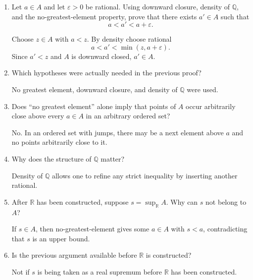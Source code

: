 \documentclass{self-check}
\begin{document}
\begin{enumerate}[label=\arabic*., itemsep=10pt]
\begin{answer}
Any $b\in B$ is an upper bound for every element of $A$.
\end{answer}

\item Let $a\in A$ and let $\varepsilon>0$ be rational.
Using downward closure, density of $\mathbb{Q}$, and the no-greatest-element property, prove that there exists $a'\in A$ such that
\[
a<a'<a+\varepsilon.
\]

\begin{answer}
Choose $z\in A$ with $a<z$. By density choose rational
\[
a<a'<\min(z,a+\varepsilon).
\]
Since $a'<z$ and $A$ is downward closed, $a'\in A$.
\end{answer}

\item Which hypotheses were actually needed in the previous proof?

\begin{answer}
No greatest element, downward closure, and density of $\mathbb{Q}$ were used.
\end{answer}

\item Does ``no greatest element'' alone imply that points of $A$ occur arbitrarily close above every $a\in A$ in an arbitrary ordered set?

\begin{answer}
No. In an ordered set with jumps, there may be a next element above $a$ and no points arbitrarily close to it.
\end{answer}

\item Why does the structure of $\mathbb{Q}$ matter?

\begin{answer}
Density of $\mathbb{Q}$ allows one to refine any strict inequality by inserting another rational.
\end{answer}

\item After $\mathbb{R}$ has been constructed, suppose $s=\sup_{\mathbb{R}}A$.
Why can $s$ not belong to $A$?

\begin{answer}
If $s\in A$, then no-greatest-element gives some $a\in A$ with $s<a$, contradicting that $s$ is an upper bound.
\end{answer}

\item Is the previous argument available before $\mathbb{R}$ is constructed?

\begin{answer}
Not if $s$ is being taken as a real supremum before $\mathbb{R}$ has been constructed.
\end{answer}

\end{enumerate}
\end{document}
